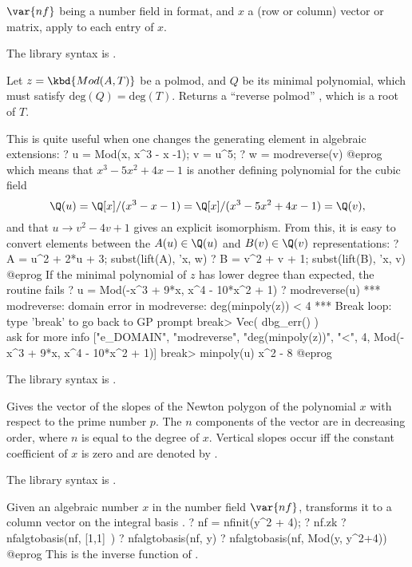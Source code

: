 $\var{nf}$ being a number field in  format, and $x$ a
(row or column) vector or matrix, apply  to each entry
of $x$.

The library syntax is .

\label{se:modreverse}
Let $z = \kbd{Mod(A, T)}$ be a polmod, and $Q$ be its minimal
polynomial, which must satisfy $\text{deg}(Q) = \text{deg}(T)$.
Returns a ``reverse polmod'' , which is a root of $T$.

This is quite useful when one changes the generating element in algebraic
extensions:
\bprog
? u = Mod(x, x^3 - x -1); v = u^5;
? w = modreverse(v)
@eprog\noindent
which means that $x^3 - 5x^2 + 4x -1$ is another defining polynomial for the
cubic field
$$\Q(u) = \Q[x]/(x^3 - x - 1) = \Q[x]/(x^3 - 5x^2 + 4x - 1) = \Q(v),$$
and that $u \to v^2 - 4v + 1$ gives an explicit isomorphism. From this, it is
easy to convert elements between the $A(u)\in \Q(u)$ and $B(v)\in \Q(v)$
representations:
\bprog
? A = u^2 + 2*u + 3; subst(lift(A), 'x, w)
? B = v^2 + v + 1;   subst(lift(B), 'x, v)
@eprog
If the minimal polynomial of $z$ has lower degree than expected, the routine
fails
\bprog
? u = Mod(-x^3 + 9*x, x^4 - 10*x^2 + 1)
? modreverse(u)
 *** modreverse: domain error in modreverse: deg(minpoly(z)) < 4
 ***   Break loop: type 'break' to go back to GP prompt
break> Vec( dbg_err() ) \\ ask for more info
["e_DOMAIN", "modreverse", "deg(minpoly(z))", "<", 4,
  Mod(-x^3 + 9*x, x^4 - 10*x^2 + 1)]
break> minpoly(u)
x^2 - 8
@eprog

The library syntax is .

\label{se:newtonpoly}
Gives the vector of the slopes of the Newton
polygon of the polynomial $x$ with respect to the prime number $p$. The $n$
components of the vector are in decreasing order, where $n$ is equal to the
degree of $x$. Vertical slopes occur iff the constant coefficient of $x$ is
zero and are denoted by .

The library syntax is .

\label{se:nfalgtobasis}
Given an algebraic number $x$ in the number field $\var{nf}$,
transforms it to a column vector on the integral basis .
\bprog
? nf = nfinit(y^2 + 4);
? nf.zk
? nfalgtobasis(nf, [1,1]~)
? nfalgtobasis(nf, y)
? nfalgtobasis(nf, Mod(y, y^2+4))
@eprog
This is the inverse function of .

